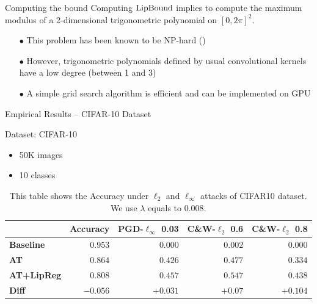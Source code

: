 \begin{frame}{Computing the bound}
  Computing $\operatorname*{LipBound}$ implies to compute the maximum modulus of a 2-dimensional trigonometric polynomial on 
  $[ 0, 2\pi]^2$.

  \begin{itemize}
    \item[$\bullet$] This problem has been known to be NP-hard (\cite{pfister2018bounding})
    \item[$\bullet$] However, trigonometric polynomials defined by usual convolutional kernels have a low degree (between 1 and 3)
    \item[$\bullet$] A simple grid search algorithm is efficient and can be implemented on GPU
  \end{itemize}

\end{frame}




\begin{frame}{Empirical Results -- CIFAR-10 Dataset}

  \begin{block}{Dataset: CIFAR-10}
  \begin{itemize}
    \item 50K images
    \item 10 classes
  \end{itemize}
  \end{block}

  \begin{table}[t]
    \centering
      {\small
      \begin{tabular}{lrrrr}
      \toprule
      & \textbf{Accuracy} & \textbf{PGD-$\ell_\infty$ 0.03} & \textbf{C\&W-$\ell_2$ 0.6} & \textbf{C\&W-$\ell_2$ 0.8} \\
      \midrule
      \textbf{Baseline} & $\mathbf{0.953}$ & $\phantom{.}0.000$ & $\phantom{.}0.002$ & $\phantom{.}0.000$ \\
      \textbf{AT} & $\phantom{.}0.864$ & $\phantom{.}0.426$ & $\phantom{.}0.477$ & $\phantom{.}0.334$ \\
      \textbf{AT+LipReg} & $\phantom{.}0.808$ & $\mathbf{0.457}$ & $\mathbf{0.547}$ & $\mathbf{0.438}$ \\
      \midrule
      \textbf{Diff} & $-0.056$ & $+0.031$ & $+0.07$ & $+0.104$ \\
      \bottomrule
      \end{tabular}%
      }
    \caption{This table shows the Accuracy under $\ell_2$ and $\ell_\infty$ attacks of CIFAR10 dataset. We use $\lambda$ equals to $0.008$.}
    \label{tab:table_cifar10_robustness}%
  \end{table}%



\end{frame}





